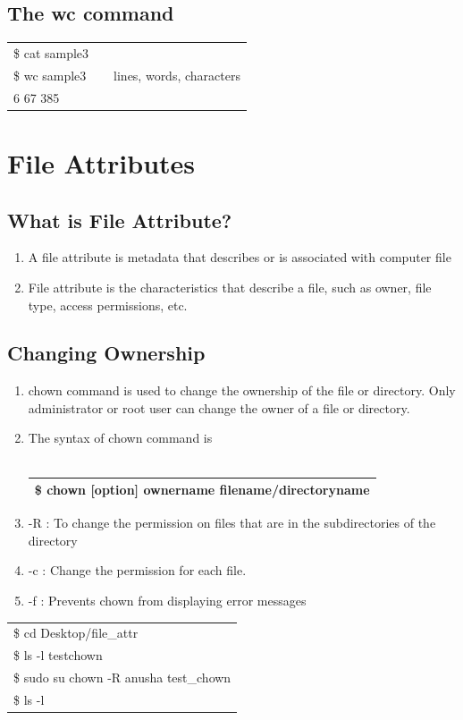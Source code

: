 \documentclass[12pt, a4paper]{report}
\begin{document}
\section{The wc command}
\begin{tabular}{|lcr|} \hline
\$ cat sample3 && \\
\$ wc sample3 && lines, words, characters\\
6 67 385&&\\ \hline
\end{tabular}
%
\chapter{File Attributes}
\section{What is File Attribute?}
\begin{enumerate}
\item A file attribute is metadata that describes or is associated with computer file
\item File attribute is the characteristics that describe a file, such as owner, file type, access permissions, etc.
\end{enumerate}
\section{Changing Ownership}
\begin{enumerate}
\item chown command is used to change the ownership of the file or directory. Only administrator or root user can change the owner of a file or directory.
\item The syntax of chown command is\\ 
\\
\begin{tabular}{|l|}\hline
\$ chown [option] ownername filename/directoryname\\ \hline
\end{tabular}
\item -R : To change the permission on files that are in the subdirectories of the directory
\item -c : Change the permission for each file.
\item -f : Prevents chown from displaying error messages
\end{enumerate}
\begin{tabular}{|l|}\hline
\$ cd Desktop/file\_attr\\
\$ ls -l testchown\\
\$ sudo su chown -R anusha test\_chown\\
\$ ls -l\\ \hline
\end{tabular}
\end{document}
